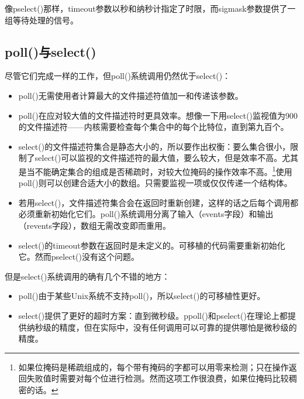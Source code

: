 像pselect()那样，timeout参数以秒和纳秒计指定了时限，而sigmask参数提供了一组等待处理的信号。 

\subsection{poll()与select()}

尽管它们完成一样的工作，但poll()系统调用仍然优于select()： 

\begin{itemize}
\item \begin{flushleft}poll()无需使用者计算最大的文件描述符值加一和传递该参数。\end{flushleft}
\item \begin{flushleft}poll()在应对较大值的文件描述符时更具效率。想像一下用select()监视值为900的文件描述符——内核需要检查每个集合中的每个比特位，直到第九百个。\end{flushleft}
\item \begin{flushleft}select()的文件描述符集合是静态大小的，所以要作出权衡：要么集合很小，限制了select()可以监视的文件描述符的最大值，要么较大，但是效率不高。尤其是当不能确定集合的组成是否稀疏时，对较大位掩码的操作效率不高。\footnote[1]{如果位掩码是稀疏组成的，每个带有掩码的字都可以用零来检测；只在操作返回失败值时需要对每个位进行检测。然而这项工作很浪费，如果位掩码比较稠密的话。}使用poll()则可以创建合适大小的数组。只需要监视一项或仅仅传递一个结构体。\end{flushleft}
\item \begin{flushleft}若用select()，文件描述符集合会在返回时重新创建，这样的话之后每个调用都必须重新初始化它们。poll()系统调用分离了输入（events字段）和输出（revents字段），数组无需改变即而重用。\end{flushleft}
\item \begin{flushleft}select()的timeout参数在返回时是未定义的。可移植的代码需要重新初始化它。然而pselect()没有这个问题。\end{flushleft}
\end{itemize}

但是select()系统调用的确有几个不错的地方：

\begin{itemize}
\item \begin{flushleft}poll()由于某些Unix系统不支持poll()，所以select()的可移植性更好。\end{flushleft}
\item \begin{flushleft}select()提供了更好的超时方案：直到微秒级。ppoll()和pselect()在理论上都提供纳秒级的精度，但在实际中，没有任何调用可以可靠的提供哪怕是微秒级的精度。\end{flushleft}
\end{itemize}

